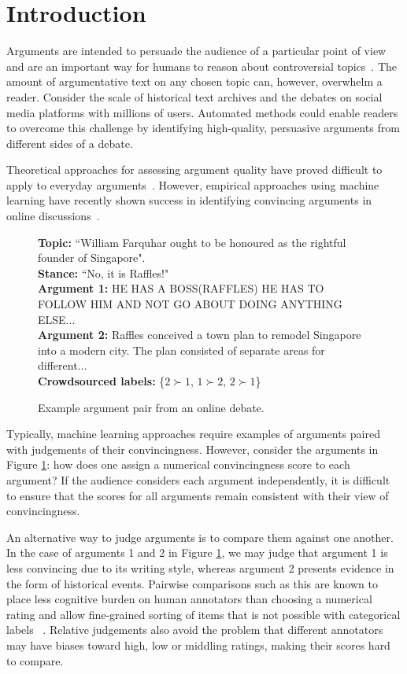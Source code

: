 \section{Introduction}\label{sec:intro}

Arguments are intended to persuade the audience of a particular point of view and 
are an important way for humans to reason about controversial topics~\cite{mercier2011humans}. 
The amount of argumentative text on any chosen topic can, however, overwhelm a reader.
Consider the scale of historical text archives 
and the debates on social media platforms with millions of users.
Automated methods could enable readers to overcome this challenge by identifying high-quality, 
persuasive arguments from different sides of a debate. 

Theoretical approaches for assessing argument quality have proved difficult to apply to everyday arguments~\cite{boudry2015fake}.
However, empirical approaches using machine learning have recently shown success in 
identifying convincing arguments in online discussions~\cite{habernal2016argument}.
\begin{figure}
\textbf{Topic:} ``William Farquhar ought to be honoured as the rightful founder of Singapore". \\
\textbf{Stance:} ``No, it is Raffles!" \\
\textbf{Argument 1:}  
HE HAS A BOSS(RAFFLES) HE HAS TO FOLLOW HIM AND NOT GO ABOUT DOING ANYTHING ELSE... \\
\textbf{Argument 2:} 
Raffles conceived a town plan to remodel Singapore into a modern city. The plan consisted of separate areas for different...\\
\textbf{Crowdsourced labels:} \{$2 \succ 1$, $1 \succ 2$, $2 \succ 1$\} 
\caption{Example argument pair from an online debate.}
\label{fig:argument_examples}
\end{figure}
Typically, machine learning approaches require examples of arguments paired with judgements of their convincingness.
However, consider the arguments in Figure \ref{fig:argument_examples}:
how does one assign a numerical convincingness score to each argument? 
If the audience considers each argument independently, it is difficult to ensure that the scores for all arguments
remain consistent with their view of convincingness.

An alternative way to judge arguments is to compare them against one another. 
In the case of arguments 1 and 2 in Figure \ref{fig:argument_examples}, we may judge that argument 1 is less convincing due to its writing style, whereas argument 2 
presents evidence in the form of historical events.
Pairwise comparisons such as this are known to place less cognitive burden on human annotators than  
choosing a numerical rating and allow fine-grained sorting of items that is not possible with categorical labels
~\cite{kendall1948rank,kingsley2006preference}.
Relative judgements also avoid the problem that different annotators 
may have biases toward high, low or middling ratings, making their scores hard to compare.

